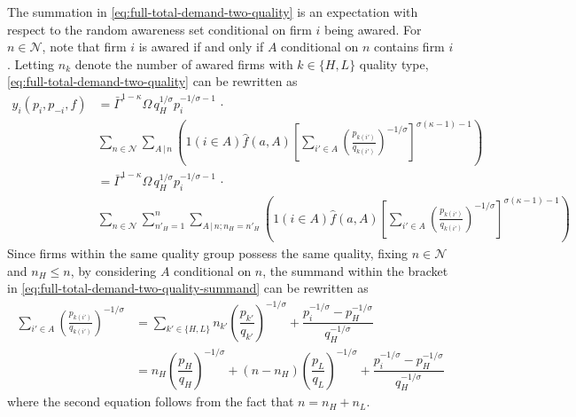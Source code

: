 \documentclass[12pt]{article}
\begin{document}
The summation in \eqref{eq:full-total-demand-two-quality} is an expectation with respect to the random awareness set conditional on firm $i$ being awared. For $n \in \mathcal{N}$, note that firm $i$ is awared if and only if $A$ conditional on $n$ contains firm $i$. Letting $n_k$ denote the number of awared firms with $k \in \{H, L\}$ quality type, \eqref{eq:full-total-demand-two-quality} can be rewritten as
\begin{align}
	y_{i}(p_i, p_{-i}, f) &= \bar{\Gamma}^{1-\kappa}\Omega \, q_H^{1/\sigma}p_i^{-1/\sigma - 1}\, \cdot \\ 
	& \sum_{n \in \mathcal{N} }  \sum_{{A}\,|\,n}\left( 1( i \in A ) \hat{f}(a,A)\left[\sum_{i'\in A}\left( \frac{p_{k(i')}}{q_{k(i')}}\right)^{-1/\sigma}\right]^{\sigma (\kappa - 1)-1}\right)  \\
	&= \bar{\Gamma}^{1-\kappa}\Omega \, q_H^{1/\sigma}p_i^{-1/\sigma - 1}\, \cdot \\ 
	&\sum_{n \in \mathcal{N} } \sum_{n'_H =1}^n \sum_{{A}\,|\,n; n_H = n'_H}\left( 1( i \in A ) \hat{f}(a,A)\left[\sum_{i'\in A}\left( \frac{p_{k(i')}}{q_{k(i')}}\right)^{-1/\sigma}\right]^{\sigma (\kappa - 1)-1}\right)  
	\label{eq:full-total-demand-two-quality-summand}
\end{align}
Since firms within the same quality group possess the same quality, fixing $n \in \mathcal{N}$ and $n_H \leq n$, by considering $A$ conditional on $n$, the summand within the bracket in \cref{eq:full-total-demand-two-quality-summand} can be rewritten as 
\begin{align}
\sum_{i'\in A}\left( \frac{p_{k(i')}}{q_{k(i')}}\right)^{-1/\sigma} &= \sum_{k' \in \{H, L\} } n_{k'} \left( \dfrac{p_{k'}}{q_{k'}}  \right)^{-1/\sigma} +   
\dfrac{p_i^{-1/\sigma} - p^{-1/\sigma}_{H} }{ q_H^{-1/\sigma }} \\
&= n_H \left( \dfrac{p_{H}}{q_{H}}   \right)^{-1/\sigma} +  
(n - n_H) \left( \dfrac{p_{L}}{q_{L}}   \right)^{-1/\sigma} +
\dfrac{p_i^{-1/\sigma} - p^{-1/\sigma}_{H} }{ q_H^{-1/\sigma }}  \label{eq:full-total-demand-two-quality-summand-alternative}
\end{align}
where the second equation follows from the fact that $n = n_H + n_L$.
\end{document}

